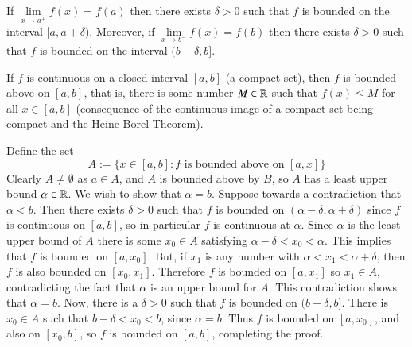 \documentclass[12pt]{report}
\begin{document}
\begin{cor}{}{}
    If $\lim\limits_{x\rightarrow a^+}f(x) = f(a)$ then there exists $\delta > 0$ such that $f$ is bounded on the interval $[a,a+\delta)$. Moreover, if $\lim\limits_{x\rightarrow b^-}f(x) = f(b)$ then there exists $\delta > 0$ such that $f$ is bounded on the interval $(b-\delta, b]$.
\end{cor}


\begin{thm}{}{}
    If $f$ is continuous on a closed interval $[a,b]$ (a compact set), then $f$ is bounded above on $[a,b]$, that is, there is some number $M \in \mathbb R$ such that $f(x) \leq M$ for all $x \in [a,b]$ (consequence of the continuous image of a compact set being compact and the Heine-Borel Theorem).
\end{thm}
\begin{proof*}{}{}
    Define the set $$A:= \{x\in [a,b]:\text{$f$ is bounded above on $[a,x]$}\}$$
    Clearly $A \neq \emptyset$ as $a \in A$, and $A$ is bounded above by $B$, so $A$ has a least upper bound $\alpha \in \mathbb R$. We wish to show that $\alpha = b$. Suppose towards a contradiction that $\alpha < b$. Then there exists $\delta > 0$ such that $f$ is bounded on $(\alpha-\delta, \alpha + \delta)$ since $f$ is continuous on $[a,b]$, so in particular $f$ is continuous at $\alpha$. Since $\alpha$ is the least upper bound of $A$ there is some $x_0 \in A$ satisfying $\alpha - \delta < x_0 < \alpha$. This implies that $f$ is bounded on $[a,x_0]$. But, if $x_1$ is any number with $\alpha < x_1 < \alpha + \delta$, then $f$ is also bounded on $[x_0,x_1]$. Therefore $f$ is bounded on $[a,x_1]$ so $x_1 \in A$, contradicting the fact that $\alpha$ is an upper bound for $A$. This contradiction shows that $\alpha = b$. Now, there is a $\delta > 0$ such that $f$ is bounded on $(b-\delta, b]$. There is $x_0 \in A$ such that $b - \delta < x_0 < b$, since $\alpha = b$. Thus $f$ is bounded on $[a,x_0]$, and also on $[x_0,b]$, so $f$ is bounded on $[a,b]$, completing the proof.
\end{proof*}
\end{document}
